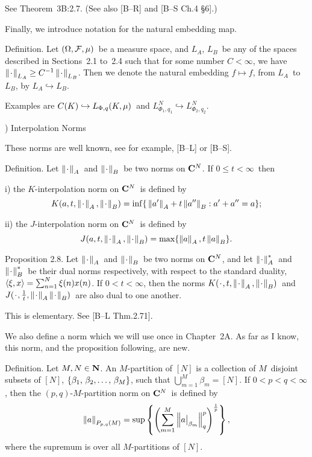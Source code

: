\Proof See Theorem~3B:2.7. (See also [B--R] and [B--S Ch.4 \S6].)
\endproof
 
Finally, we introduce notation for the natural embedding map.
 
\proclaim Definition. Let $(\Omega,{\cal F},\mu)$\ be a measure space, and $L_A$,
$L_B$\ be any of the spaces described in Sections~2.1 to~2.4 such that
for some number $C<\infty$, we have
$\left\| \kern0.8pt\cdot\kern0.8pt \right\|_{L_A} \ge C^{-1} \left\| \kern0.8pt\cdot\kern0.8pt \right\|_{L_B}$.
Then we denote the natural
embedding $f\mapsto f$, from $L_A$\ to
$L_B$, by $L_A \hookrightarrow L_B$.
 
Examples are $C(K) \hookrightarrow L_{\Phi,q}(K,\mu)$\ and
$L_{\Phi_1,q_1}^N \hookrightarrow L_{\Phi_2,q_2}^N$.
 
) Interpolation Norms
 
These norms are well known, see for example, [B--L] or [B--S].
 
\proclaim Definition. Let $\left\| \kern0.8pt\cdot\kern0.8pt \right\|_A$\ and $\left\| \kern0.8pt\cdot\kern0.8pt \right\|_B$\ be two norms on
${\bf C}^N$. If $0\le t<\infty$\ then
\item{i)} the {\dt $K$-interpolation norm} on ${\bf C}^N$\ is defined by
$$ K(a,t,\left\| \kern0.8pt\cdot\kern0.8pt \right\|_A,\left\| \kern0.8pt\cdot\kern0.8pt \right\|_B) = \inf
\{\,\left\| a' \right\|_A + t \left\| a''
   \right\|_B: a'+a''=a\};$$
\item{ii)} the {\dt $J$-interpolation norm} on ${\bf C}^N$\ is defined by
$$ J(a,t,\left\| \kern0.8pt\cdot\kern0.8pt \right\|_A,\left\| \kern0.8pt\cdot\kern0.8pt \right\|_B) = \max \{\left\| a \right\|_A,t\left\| a \right\|_B\}.$$
 
\proclaim Proposition 2.8. Let $\left\| \kern0.8pt\cdot\kern0.8pt \right\|_A$\
and $\left\| \kern0.8pt\cdot\kern0.8pt \right\|_B$\ be two norms on
${\bf C}^N$, and let $\left\| \kern0.8pt\cdot\kern0.8pt \right\|_A^*$\ and $\left\| \kern0.8pt\cdot\kern0.8pt \right\|_B^*$\ be their dual norms
respectively, with respect to the standard
duality, $\langle \xi,x \rangle =
\sum_{n=1}^N \xi(n) x(n)$. If $0<t<\infty$, then the
norms $K(\kern0.8pt\cdot\kern0.8pt,t,\left\| \kern0.8pt\cdot\kern0.8pt \right\|_A,\left\| \kern0.8pt\cdot\kern0.8pt \right\|_B)$\ and
$J(\kern0.8pt\cdot\kern0.8pt,{1\over t},\left\| \kern0.8pt\cdot\kern0.8pt \right\|_A\left\| \kern0.8pt\cdot\kern0.8pt \right\|_B)$\ are also dual to one another.
 
\Proof This is elementary. See [B--L Thm.2.71].
\endproof
 
We also define a norm which we will use
once in Chapter~2A. As far as I know,
this norm, and the proposition following, are new.
 
\proclaim Definition. Let $M,N\in{\bf N}$. An {\dt $M$-partition} of $[N]$ is a
collection of $M$\ disjoint subsets of $[N]$, $\{\betaM\}$, such that
$\bigcup_{m=1}^M \beta_m = [N]$. If $0<p<q<\infty$, then the
{\dt $(p,q)$-$M$-partition norm} on ${\bf C}^N$\ is defined by
$$ \left\| a \right\|_{P_{p,q}(M)} = \sup \left\{ \left( \sum_{m=1}^M \left\| a\big|_{\beta_m} \right\|_q^p
                  \right)^{1\over p} \right\},$$
where the supremum is over all $M$-partitions of\/ $[N]$.
 
